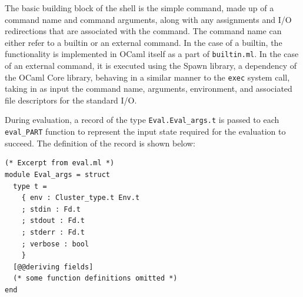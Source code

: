 \documentclass[oneside]{report}
\begin{document}



The basic building block of the shell is the simple command, made up of a command name and command arguments, along with any assignments and I/O redirections that are associated with the command.
The command name can either refer to a builtin or an external command.
In the case of a builtin, the functionality is implemented in OCaml itself as a part of \texttt{builtin.ml}.
In the case of an external command, it is executed using the Spawn library, a dependency of the OCaml Core library, behaving in a similar manner to the \texttt{exec} system call, taking in as input the command name, arguments, environment, and associated file descriptors for the standard I/O.

During evaluation, a record of the type \texttt{Eval.Eval\_args.t} is passed to each \texttt{eval\_PART} function to represent the input state required for the evaluation to succeed. The definition of the record is shown below:

\begin{minipage}[c]{\textwidth-15pt}
  \begin{lstlisting}
(* Excerpt from eval.ml *)
module Eval_args = struct
  type t =
    { env : Cluster_type.t Env.t
    ; stdin : Fd.t
    ; stdout : Fd.t
    ; stderr : Fd.t
    ; verbose : bool
    }
  [@@deriving fields]
  (* some function definitions omitted *)
end
\end{lstlisting}
  \smallskip
\end{minipage}
\end{document}
